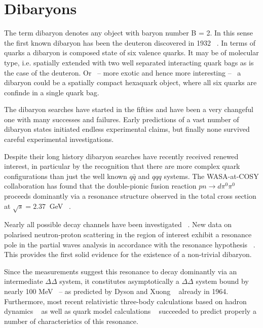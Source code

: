 %
\chapter{Dibaryons} \label{sec:2}


The term dibaryon denotes any object with baryon number B = 2. In this sense the first known dibaryon
has been the deuteron discovered in 1932 ~\cite{deu_disc}.
In terms of quarks a dibaryon is composed state of six valence quarks.
It may be of molecular type, i.e. spatially extended with two well separated interacting quark 
bags as is the case of the deuteron. Or \ -- more exotic and hence more interesting -- \ a dibaryon
could be a spatially compact hexaquark object, where all six quarks are confinde in a single quark bag.

The dibaryon searches have started in the fifties and have been a very changeful one with many 
successes and failures. 
Early predictions of a vast number of dibaryon states initiated endless experimental claims,
but finally none survived careful experimental investigations. 

Despite their long history dibaryon searches have recently received renewed interest,
in particular by the recognition that there are more complex quark configurations than just the 
well known $q\bar{q}$ and $qqq$ systems.
The WASA-at-COSY collaboration has found that the double-pionic fusion reaction $pn \rightarrow 
d \pi^{0} \pi^{0}$ proceeds dominantly via a resonance structure observed in the total cross section 
at $\sqrt{s} = 2.37\ $ GeV ~\cite{wasa1}.


Nearly all possible decay channels have been investigated ~\cite{wasa2, wasa3, wasa4}.
New data on polarised neutron-proton scattering in the region of interest exhibit a resonance pole in 
the partial waves analysis in accordance with the resonance hypothesis ~\cite{wasa5,wasa6}.
This provides the first solid evidence for the existence of a non-trivial dibaryon.

Since the measurements suggest this resonance to decay dominantly via an intermediate $\Delta \Delta$
system, it constitutes asymptotically a $\Delta \Delta$ system bound by nearly 100 MeV \ -- as 
predicted by Dyson and Xuong ~\cite{dysonxuong} already in 1964.
Furthermore, most recent relativistic three-body calculations based on hadron dynamics ~\cite{haddin}
as well as quark model calculations ~\cite{dsqm1,dsqm2} succeeded to predict properly a number
of characteristics of this resonance.

